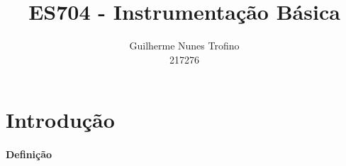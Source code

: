 \documentclass{article}
\title{ES704 - Instrumentação Básica}
\author{Guilherme Nunes Trofino\\217276}
\begin{document}
    \maketitle
\newpage

    \tableofcontents
\newpage

    \section{Introdução}
        \paragraph{Definição}
\end{document}
